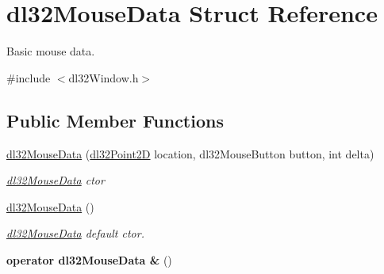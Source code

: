 \hypertarget{structdl32_mouse_data}{\section{dl32\-Mouse\-Data Struct Reference}
\label{structdl32_mouse_data}
}


Basic mouse data.  




{\ttfamily \#include $<$dl32\-Window.\-h$>$}

\subsection*{Public Member Functions}
\begin{DoxyCompactItemize}
\item 
\hyperlink{structdl32_mouse_data_a84a53a06d5a9c071996ab3e4e62c84a8}{dl32\-Mouse\-Data} (\hyperlink{structdl32_point2_d}{dl32\-Point2\-D} location, dl32\-Mouse\-Button button, int delta)
\begin{DoxyCompactList}\small\item\em \hyperlink{structdl32_mouse_data}{dl32\-Mouse\-Data} ctor \end{DoxyCompactList}\item 
\hyperlink{structdl32_mouse_data_a5a6df7c3d88545931c1a0ebb8439c125}{dl32\-Mouse\-Data} ()
\begin{DoxyCompactList}\small\item\em \hyperlink{structdl32_mouse_data}{dl32\-Mouse\-Data} default ctor. \end{DoxyCompactList}\item 
\hypertarget{structdl32_mouse_data_a975006fb6192fc9dc83e8a4497ebe072}{{\bfseries operator dl32\-Mouse\-Data \&} ()}\label{structdl32_mouse_data_a975006fb6192fc9dc83e8a4497ebe072}

\end{DoxyCompactItemize}
